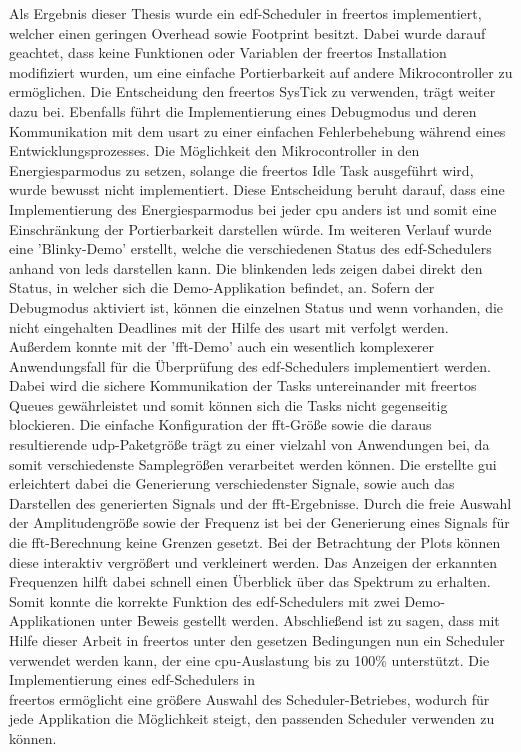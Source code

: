 \documentclass[../EDF Master Thesis.tex]{subfiles}
\begin{document}
    Als Ergebnis dieser Thesis wurde ein \ac{edf}-Scheduler in \ac{freertos} implementiert, welcher einen geringen Overhead sowie Footprint besitzt.
    Dabei wurde darauf geachtet, dass keine Funktionen oder Variablen der \ac{freertos} Installation modifiziert wurden, um eine einfache Portierbarkeit auf andere Mikrocontroller zu ermöglichen.
    Die Entscheidung den \ac{freertos} SysTick zu verwenden, trägt weiter dazu bei.
    Ebenfalls führt die Implementierung eines Debugmodus und deren Kommunikation mit dem \ac{usart} zu einer einfachen Fehlerbehebung während eines Entwicklungsprozesses.
    Die Möglichkeit den Mikrocontroller in den Energiesparmodus zu setzen, solange die \ac{freertos} Idle Task ausgeführt wird, wurde bewusst nicht implementiert.
    Diese Entscheidung beruht darauf, dass eine Implementierung des Energiesparmodus bei jeder \ac{cpu} anders ist und somit eine Einschränkung der Portierbarkeit darstellen würde.
    Im weiteren Verlauf wurde eine 'Blinky-Demo' erstellt, welche die verschiedenen Status des \ac{edf}-Schedulers anhand von \ac{led}s darstellen kann.
    Die blinkenden \ac{led}s zeigen dabei direkt den Status, in welcher sich die Demo-Applikation befindet, an.
    Sofern der Debugmodus aktiviert ist, können die einzelnen Status und wenn vorhanden, die nicht eingehalten Deadlines mit der Hilfe des \ac{usart} mit verfolgt werden.
    Außerdem konnte mit der '\ac{fft}-Demo' auch ein wesentlich komplexerer Anwendungsfall für die Überprüfung des \ac{edf}-Schedulers implementiert werden.
    Dabei wird die sichere Kommunikation der Tasks untereinander mit \ac{freertos} Queues gewährleistet und somit können sich die Tasks nicht gegenseitig blockieren.
    Die einfache Konfiguration der \ac{fft}-Größe sowie die daraus resultierende \ac{udp}-Paketgröße trägt zu einer vielzahl von Anwendungen bei, da somit verschiedenste Samplegrößen verarbeitet werden können.
    Die erstellte \ac{gui} erleichtert dabei die Generierung verschiedenster Signale, sowie auch das Darstellen des generierten Signals und der \ac{fft}-Ergebnisse.
    Durch die freie Auswahl der Amplitudengröße sowie der Frequenz ist bei der Generierung eines Signals für die \ac{fft}-Berechnung keine Grenzen gesetzt.
    Bei der Betrachtung der Plots können diese interaktiv vergrößert und verkleinert werden.
    Das Anzeigen der erkannten Frequenzen hilft dabei schnell einen Überblick über das Spektrum zu erhalten.
    Somit konnte die korrekte Funktion des \ac{edf}-Schedulers mit zwei Demo-Applikationen unter Beweis gestellt werden.
    Abschließend ist zu sagen, dass mit Hilfe dieser Arbeit in \ac{freertos} unter den gesetzen Bedingungen nun ein Scheduler verwendet werden kann, der eine \ac{cpu}-Auslastung bis zu 100\% unterstützt.
    Die Implementierung eines \ac{edf}-Schedulers in \\\ac{freertos} ermöglicht eine größere Auswahl des Scheduler-Betriebes, wodurch für jede Applikation die Möglichkeit steigt, den passenden Scheduler verwenden zu können.
\end{document}
